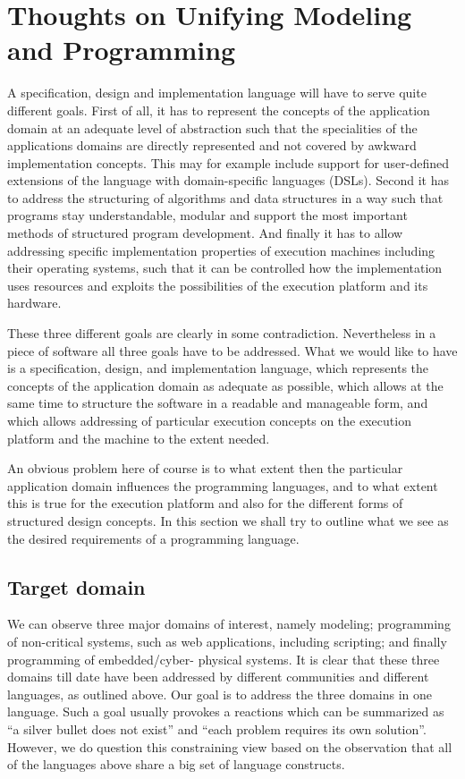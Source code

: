

\section{Thoughts on Unifying Modeling and Programming}

A specification, design and implementation language will have to 
serve quite different goals. First of all, it has to represent the 
concepts of the application domain at an adequate level of 
abstraction such that the specialities of the applications domains 
are directly represented and not covered by awkward implementation 
concepts. This may for example include support for user-defined 
extensions of the language with domain-specific languages (DSLs). 
Second it has to address the structuring of algorithms and data 
structures in a way such that programs stay understandable, modular 
and support the most important methods of structured program 
development. And finally it has to allow addressing specific 
implementation properties of execution machines including their 
operating systems, such that it can be controlled how the 
implementation uses resources and exploits the possibilities of the 
execution platform and its hardware. 

These three different goals are clearly in some contradiction. 
Nevertheless in a piece of software all three goals have to be 
addressed. What we would like to have is a specification, design, 
and implementation language, which represents the concepts of the 
application domain as adequate as possible, which allows at the 
same time to structure the software in a readable and manageable 
form, and which allows addressing of particular execution concepts 
on the execution platform and the machine to the extent needed. 

An obvious problem here of course is to what extent then the 
particular application domain influences the programming languages, 
and to what extent this is true for the execution platform and also 
for the different forms of structured design concepts. In this 
section we shall try to outline what we see as the desired 
requirements of a programming language. 


\subsection{Target domain}

We can observe three major domains of interest, namely modeling; 
programming of non-critical systems, such as web applications, 
including scripting; and finally programming of embedded/cyber-
physical systems. It is clear that these three domains till date 
have been addressed by different communities and different 
languages, as outlined above. Our goal is to address the three 
domains in one language. Such a goal usually provokes a reactions 
which can be summarized as
“a silver bullet does not exist” and “each problem requires its own 
solution”. However, we do question this constraining view based on 
the observation that all of the languages above share a big set of 
language constructs.

